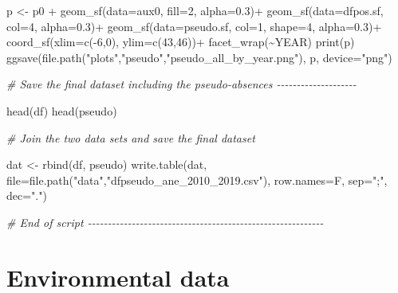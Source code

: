 \documentclass[
]{book}
\newenvironment{Shaded}{\begin{snugshade}}{\end{snugshade}}
\newcommand{\AttributeTok}[1]{\textcolor[rgb]{0.77,0.63,0.00}{#1}}
\newcommand{\CommentTok}[1]{\textcolor[rgb]{0.56,0.35,0.01}{\textit{#1}}}
\newcommand{\DecValTok}[1]{\textcolor[rgb]{0.00,0.00,0.81}{#1}}
\newcommand{\FloatTok}[1]{\textcolor[rgb]{0.00,0.00,0.81}{#1}}
\newcommand{\FunctionTok}[1]{\textcolor[rgb]{0.00,0.00,0.00}{#1}}
\newcommand{\NormalTok}[1]{#1}
\newcommand{\OtherTok}[1]{\textcolor[rgb]{0.56,0.35,0.01}{#1}}
\newcommand{\SpecialCharTok}[1]{\textcolor[rgb]{0.00,0.00,0.00}{#1}}
\newcommand{\StringTok}[1]{\textcolor[rgb]{0.31,0.60,0.02}{#1}}
\begin{document}
\begin{Shaded}
\begin{Highlighting}[]
\NormalTok{p }\OtherTok{\textless{}{-}}\NormalTok{ p0 }\SpecialCharTok{+}
  \FunctionTok{geom\_sf}\NormalTok{(}\AttributeTok{data=}\NormalTok{aux0, }\AttributeTok{fill=}\DecValTok{2}\NormalTok{, }\AttributeTok{alpha=}\FloatTok{0.3}\NormalTok{)}\SpecialCharTok{+}
  \FunctionTok{geom\_sf}\NormalTok{(}\AttributeTok{data=}\NormalTok{dfpos.sf, }\AttributeTok{col=}\DecValTok{4}\NormalTok{, }\AttributeTok{alpha=}\FloatTok{0.3}\NormalTok{)}\SpecialCharTok{+}
  \FunctionTok{geom\_sf}\NormalTok{(}\AttributeTok{data=}\NormalTok{pseudo.sf, }\AttributeTok{col=}\DecValTok{1}\NormalTok{, }\AttributeTok{shape=}\DecValTok{4}\NormalTok{, }\AttributeTok{alpha=}\FloatTok{0.3}\NormalTok{)}\SpecialCharTok{+}
  \FunctionTok{coord\_sf}\NormalTok{(}\AttributeTok{xlim=}\FunctionTok{c}\NormalTok{(}\SpecialCharTok{{-}}\DecValTok{6}\NormalTok{,}\DecValTok{0}\NormalTok{), }\AttributeTok{ylim=}\FunctionTok{c}\NormalTok{(}\DecValTok{43}\NormalTok{,}\DecValTok{46}\NormalTok{))}\SpecialCharTok{+}
  \FunctionTok{facet\_wrap}\NormalTok{(}\SpecialCharTok{\textasciitilde{}}\NormalTok{YEAR)}
\FunctionTok{print}\NormalTok{(p)}
\FunctionTok{ggsave}\NormalTok{(}\FunctionTok{file.path}\NormalTok{(}\StringTok{"plots"}\NormalTok{,}\StringTok{"pseudo"}\NormalTok{,}\StringTok{"pseudo\_all\_by\_year.png"}\NormalTok{), p, }\AttributeTok{device=}\StringTok{"png"}\NormalTok{)}


\CommentTok{\# Save the final dataset including the pseudo{-}absences {-}{-}{-}{-}{-}{-}{-}{-}{-}{-}{-}{-}{-}{-}{-}{-}{-}{-}{-}{-}}

\FunctionTok{head}\NormalTok{(df)}
\FunctionTok{head}\NormalTok{(pseudo)}

\CommentTok{\# Join the two data sets and save the final dataset}

\NormalTok{dat }\OtherTok{\textless{}{-}} \FunctionTok{rbind}\NormalTok{(df, pseudo)}
\FunctionTok{write.table}\NormalTok{(dat, }\AttributeTok{file=}\FunctionTok{file.path}\NormalTok{(}\StringTok{"data"}\NormalTok{,}\StringTok{"dfpseudo\_ane\_2010\_2019.csv"}\NormalTok{), }\AttributeTok{row.names=}\NormalTok{F, }\AttributeTok{sep=}\StringTok{";"}\NormalTok{, }\AttributeTok{dec=}\StringTok{"."}\NormalTok{)}

\CommentTok{\# End of script {-}{-}{-}{-}{-}{-}{-}{-}{-}{-}{-}{-}{-}{-}{-}{-}{-}{-}{-}{-}{-}{-}{-}{-}{-}{-}{-}{-}{-}{-}{-}{-}{-}{-}{-}{-}{-}{-}{-}{-}{-}{-}{-}{-}{-}{-}{-}{-}{-}{-}{-}{-}{-}{-}{-}{-}{-}{-}{-}}
\end{Highlighting}
\end{Shaded}

\hypertarget{environmental-data}{%
\chapter{Environmental data}\label{environmental-data}}
\end{document}
